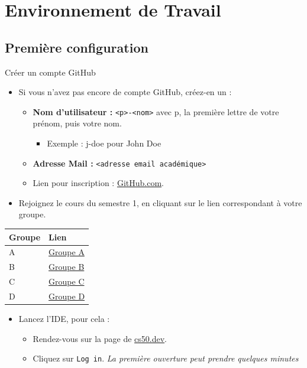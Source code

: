 
\section{Environnement de Travail}

\subsection{Première configuration}

\begin{UPSTIManipulation}{Créer un compte GitHub}
	\begin{itemize}
		\item[$\Box$] Si vous n'avez pas encore de compte GitHub, créez-en un :
		      \begin{itemize}
			      \item \textbf{Nom d'utilisateur :} \texttt{<p>-<nom>} avec p, la première lettre de votre prénom, puis votre nom.
			            \begin{itemize}
				            \item Exemple : j-doe pour John Doe
			            \end{itemize}
			      \item \textbf{Adresse Mail :} \texttt{<adresse email académique>}
			      \item[$\Box$] Lien pour inscription : \href{https://github.com}{GitHub.com}.
		      \end{itemize}
		\item[$\Box$] Rejoignez le cours du semestre 1, en cliquant sur le lien correspondant à votre groupe.
	\end{itemize}
	\begin{center}
		\begin{tabular}{|l|l|}
			\hline
			Groupe & Lien                                                                             \\
			\hline
			A      & \href{https://submit.cs50.io/invites/a818765a9fff444da530429751dc8a80}{Groupe A} \\
			B      & \href{https://submit.cs50.io/invites/dc5d2780c7404b4abe155aea944ecfc0}{Groupe B} \\
			C      & \href{https://submit.cs50.io/invites/f4e7c35a2e7a489a9548f47d0f479e66}{Groupe C} \\
			D      & \href{https://submit.cs50.io/invites/3391dcf05a02465890d9fa95e86fbca3}{Groupe D} \\
			\hline
		\end{tabular}
	\end{center}
	\begin{itemize}
		\item[$\Box$] Lancez l'IDE, pour cela :
		      \begin{itemize}
			      \item[$\Box$] Rendez-vous sur la page de \href{https://cs50.dev}{cs50.dev}.
			      \item[$\Box$] Cliquez sur \texttt{Log in}. \textit{La première ouverture peut prendre quelques minutes}
		      \end{itemize}
	\end{itemize}
\end{UPSTIManipulation}

